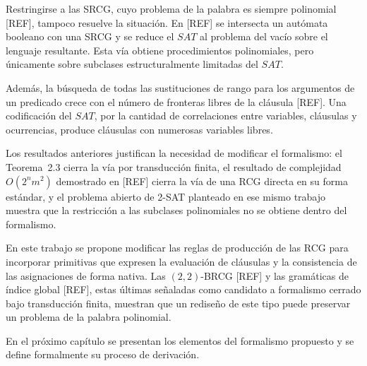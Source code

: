 \documentclass{report}
\theoremstyle{definition}
\theoremstyle{plain}
\theoremstyle{remark}
\begin{document}
Restringirse a las SRCG, cuyo problema de la palabra es siempre
polinomial [REF], tampoco resuelve la situación. En [REF] se
intersecta un autómata booleano con una SRCG y se reduce el $SAT$ al
problema del vacío sobre el lenguaje resultante. Esta vía obtiene
procedimientos polinomiales, pero únicamente sobre subclases
estructuralmente limitadas del $SAT$.

Además, la búsqueda de todas las sustituciones de rango para los
argumentos de un predicado crece con el número de fronteras libres de
la cláusula [REF]. Una codificación del $SAT$, por la cantidad de
correlaciones entre variables, cláusulas y ocurrencias, produce
cláusulas con numerosas variables libres.

Los resultados anteriores justifican la necesidad de modificar el
formalismo: el Teorema~2.3 cierra la vía por transducción finita, el
resultado de complejidad $O(2^n m^2)$ demostrado en [REF] cierra la
vía de una RCG directa en su forma estándar, y el problema abierto de
2-SAT planteado en ese mismo trabajo muestra que la restricción a las
subclases polinomiales no se obtiene dentro del formalismo.

En este trabajo se propone modificar las reglas de producción de las
RCG para incorporar primitivas que expresen la evaluación de cláusulas
y la consistencia de las asignaciones de forma nativa. Las
$(2,2)$-BRCG [REF] y las gramáticas de índice global [REF], estas
últimas señaladas como candidato a formalismo cerrado bajo transducción
finita, muestran que un rediseño de este tipo puede preservar un
problema de la palabra polinomial.

En el próximo capítulo se presentan los elementos del formalismo
propuesto y se define formalmente su proceso de derivación.
\end{document}
